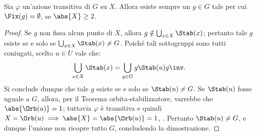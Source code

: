 \documentclass[12pt]{scrartcl}
\begin{document}
	\begin{proposition}
		Sia $\varphi$ un'azione transitiva di $G$ su $X$.
		Allora esiste sempre un $g \in G$ tale per cui $\Fix(g) = \emptyset$,
		se $\abs{X} \geq 2$.
	\end{proposition}
	
	\begin{proof}		
		Se $g$ non fissa alcun punto di $X$, allora $g \notin \bigcup_{x \in X} \Stab(x)$; pertanto tale $g$ esiste se e solo se $\bigcup_{x \in X} \Stab(x) \neq G$. Poiché tali sottogruppi sono tutti coniugati, scelto $u \in U$ vale
		che:
		\[ \bigcup_{x \in X} \Stab(x) = \bigcup_{g \in G} g \Stab(u) g\inv. \]
		Si conclude dunque che tale $g$ esiste se e solo se $\Stab(u) \neq G$.
		Se $\Stab(u)$ fosse uguale a $G$, allora, per il Teorema orbita-stabilizzatore,
		varrebbe che $\abs{\Orb(u)} = 1$; tuttavia $\varphi$ è transitiva e quindi
		$X = \Orb(u) \implies \abs{X} = \abs{\Orb(u)} = 1$, \Lightning. Pertanto
		$\Stab(u) \neq G$, e dunque l'unione non ricopre tutto $G$, concludendo
		la dimostrazione.
	\end{proof}
\end{document}
